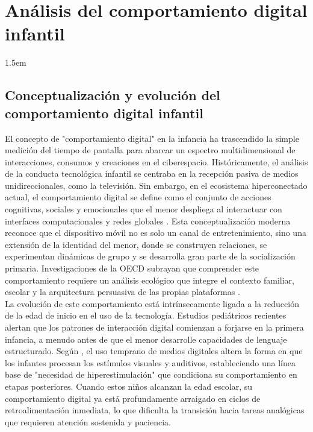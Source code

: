 \chapter{Análisis del comportamiento digital infantil}
\label{chap:comportamiento-digital}

\insertminitoc
\parindent1.5em

\section{Conceptualización y evolución del comportamiento digital infantil}

El concepto de "comportamiento digital" en la infancia ha trascendido la simple medición del tiempo de pantalla para abarcar un espectro multidimensional de interacciones, consumos y creaciones en el ciberespacio. Históricamente, el análisis de la conducta tecnológica infantil se centraba en la recepción pasiva de medios unidireccionales, como la televisión. Sin embargo, en el ecosistema hiperconectado actual, el comportamiento digital se define como el conjunto de acciones cognitivas, sociales y emocionales que el menor despliega al interactuar con interfaces computacionales y redes globales \cite{holmarsdottir_integrative_2025}. Esta conceptualización moderna reconoce que el dispositivo móvil no es solo un canal de entretenimiento, sino una extensión de la identidad del menor, donde se construyen relaciones, se experimentan dinámicas de grupo y se desarrolla gran parte de la socialización primaria. Investigaciones de la OECD subrayan que comprender este comportamiento requiere un análisis ecológico que integre el contexto familiar, escolar y la arquitectura persuasiva de las propias plataformas \cite{noauthor_full_2025}.\\

La evolución de este comportamiento está intrínsecamente ligada a la reducción de la edad de inicio en el uso de la tecnología. Estudios pediátricos recientes alertan que los patrones de interacción digital comienzan a forjarse en la primera infancia, a menudo antes de que el menor desarrolle capacidades de lenguaje estructurado. Según \cite{bozzola_use_2022}, el uso temprano de medios digitales altera la forma en que los infantes procesan los estímulos visuales y auditivos, estableciendo una línea base de "necesidad de hiperestimulación" que condiciona su comportamiento en etapas posteriores. Cuando estos niños alcanzan la edad escolar, su comportamiento digital ya está profundamente arraigado en ciclos de retroalimentación inmediata, lo que dificulta la transición hacia tareas analógicas que requieren atención sostenida y paciencia.\\



